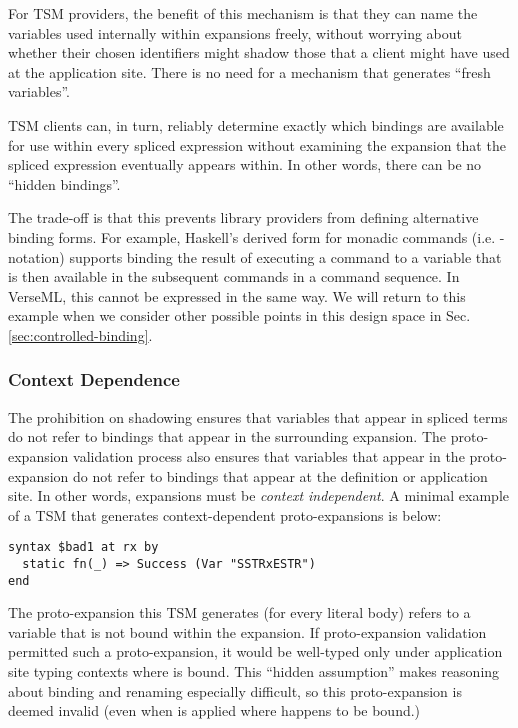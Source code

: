 For TSM providers, the benefit of this mechanism is that they can name the variables used internally within expansions freely, without worrying about whether their chosen identifiers might shadow those that a client might have used at the application site. There is no need for a mechanism that generates ``fresh variables''.

TSM clients can, in turn, reliably determine exactly which bindings are available for use within every spliced expression without examining the expansion that the spliced expression eventually appears within. In other words, there can be no ``hidden bindings''. 

The trade-off is that this prevents library providers from defining  alternative binding forms. For example, Haskell's derived form for monadic commands (i.e. -notation) supports binding the result of executing a command to a variable that is then available in the subsequent commands in a command sequence. In VerseML, this cannot be expressed in the same way. 
We will return to this example when we consider other possible points in this design space in Sec. \ref{sec:controlled-binding}.


\subsubsection{Context Dependence}
The prohibition on shadowing ensures that variables that appear in spliced terms do not refer to bindings that appear in the surrounding expansion. The proto-expansion validation process also ensures that variables that appear in the proto-expansion do not refer to bindings that appear at the definition or application site. In other words, expansions must be \emph{context independent}. A minimal example of a TSM that generates context-dependent proto-expansions is below:
\begin{lstlisting}[numbers=none]
syntax $bad1 at rx by
  static fn(_) => Success (Var "SSTRxESTR")
end
\end{lstlisting}
The proto-expansion this TSM generates (for every literal body) refers to a variable  that is not bound within the expansion. If proto-expansion validation permitted such a proto-expansion, it would be well-typed only under application site typing contexts where  is bound. This ``hidden assumption'' makes reasoning about binding and renaming especially difficult, so this proto-expansion is deemed invalid (even when  is applied where  happens to be bound.)

